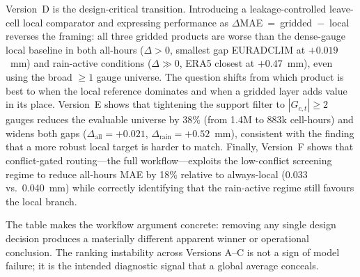 \documentclass[preprint,12pt]{elsarticle}
\begin{document}
Version~D is the design-critical transition. Introducing a leakage-controlled leave-cell local comparator and expressing performance as $\Delta$MAE~=~gridded~$-$~local reverses the framing: all three gridded products are worse than the dense-gauge local baseline in both all-hours ($\Delta > 0$, smallest gap EURADCLIM at $+0.019$~mm) and rain-active conditions ($\Delta \gg 0$, ERA5 closest at $+0.47$~mm), even using the broad ${\geq}1$ gauge universe. The question shifts from which product is best to when the local reference dominates and when a gridded layer adds value in its place. Version~E shows that tightening the support filter to $|G_{c,t}| \geq 2$ gauges reduces the evaluable universe by 38\% (from 1.4M to 883k cell-hours) and widens both gaps ($\Delta_\text{all} = +0.021$, $\Delta_\text{rain} = +0.52$~mm), consistent with the finding that a more robust local target is harder to match. Finally, Version~F shows that conflict-gated routing---the full workflow---exploits the low-conflict screening regime to reduce all-hours MAE by 18\% relative to always-local (0.033 vs.\ 0.040~mm) while correctly identifying that the rain-active regime still favours the local branch.

The table makes the workflow argument concrete: removing any single design decision produces a materially different apparent winner or operational conclusion. The ranking instability across Versions A--C is not a sign of model failure; it is the intended diagnostic signal that a global average conceals.
\end{document}

